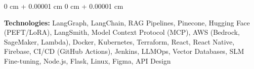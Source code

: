 \documentclass[10pt, letterpaper]{article}
\newenvironment{onecolentry}{
    \begin{adjustwidth}{
        0 cm + 0.00001 cm
    }{
        0 cm + 0.00001 cm
    }
}{
    \end{adjustwidth}
} %
\begin{document}
    \vspace{0.2 cm}

    \begin{onecolentry}
        \textbf{Technologies:} LangGraph, LangChain, RAG Pipelines, Pinecone, Hugging Face (PEFT/LoRA), LangSmith, Model Context Protocol (MCP), AWS (Bedrock, SageMaker, Lambda), Docker, Kubernetes, Terraform, React, React Native, Firebase, CI/CD (GitHub Actions), Jenkins, LLMOps, Vector Databases, SLM Fine-tuning, Node.js, Flask, Linux, Figma, API Design
        
        \fontsize{0.0001pt}{1pt}
    \end{onecolentry}

    
\end{document}

